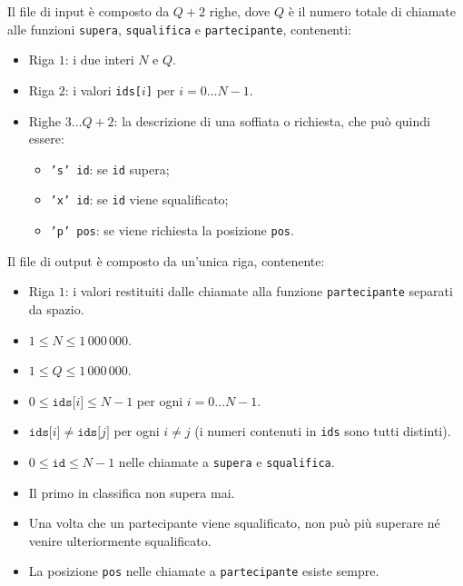 Il file di input è composto da $Q+2$ righe, dove $Q$ è il numero totale di chiamate alle funzioni \texttt{supera}, \texttt{squalifica} e \texttt{partecipante}, contenenti:
\begin{itemize}[nolistsep,itemsep=2mm]
\item Riga $1$: i due interi $N$ e $Q$.
\item Riga $2$: i valori \texttt{ids[$i$]} per $i = 0\ldots N-1$.
\item Righe $3 \ldots Q+2$: la descrizione di una soffiata o richiesta, che può quindi essere:
	\begin{itemize}
	\item \texttt{'s' id}: se \texttt{id} supera;
	\item \texttt{'x' id}: se \texttt{id} viene squalificato;
	\item \texttt{'p' pos}: se viene richiesta la posizione \texttt{pos}.
	\end{itemize}
\end{itemize}

Il file di output è composto da un'unica riga, contenente:
\begin{itemize}[nolistsep,itemsep=2mm]
\item Riga $1$: i valori restituiti dalle chiamate alla funzione \texttt{partecipante} separati da spazio.
\end{itemize}



\Constraints

\begin{itemize}[nolistsep, itemsep=2mm]
	\item $1 \le N \le 1\,000\,000$.
	\item $1 \le Q \le 1\,000\,000$.
	\item $0 \le \texttt{ids[}i\texttt{]} \le N-1$ per ogni $i=0\ldots N-1$.
	\item $\texttt{ids[}i\texttt{]} \neq \texttt{ids[}j\texttt{]}$ per ogni $i \neq j$ (i numeri contenuti in \texttt{ids} sono tutti distinti).
	\item $0 \le \texttt{id} \le N-1$ nelle chiamate a \texttt{supera} e \texttt{squalifica}.
	\item Il primo in classifica non supera mai.
	\item Una volta che un partecipante viene squalificato, non può più superare né venire ulteriormente squalificato.
	\item La posizione \texttt{pos} nelle chiamate a \texttt{partecipante} esiste sempre.
\end{itemize}

